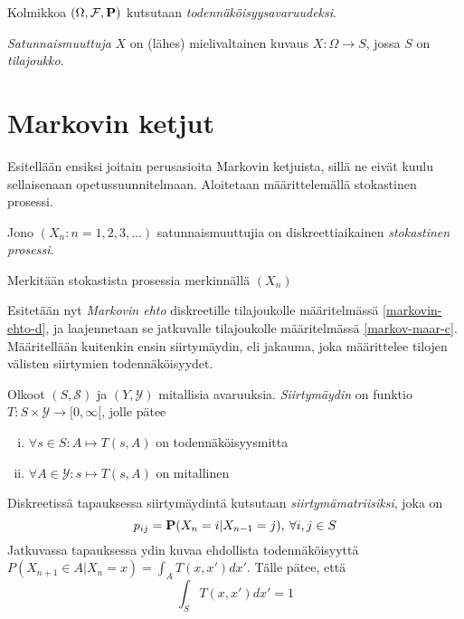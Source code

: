 \begin{maar}
	Kolmikkoa $(\Omega, \mathcal{F}, \textbf{P} )$ kutsutaan \textit{todennäköisyysavaruudeksi}.
\end{maar}

\begin{maar}
	\textit{Satunnaismuuttuja} $X$ on (lähes) mielivaltainen kuvaus $X:\Omega\rightarrow S$, jossa $S$ on \textit{tilajoukko}. 
\end{maar}



\section{Markovin ketjut}\label{kappale: mc}

Esitellään ensiksi joitain perusasioita Markovin ketjuista, sillä ne eivät kuulu sellaisenaan opetussuunnitelmaan. Aloitetaan määrittelemällä stokastinen prosessi.\cite{piiroinen_stokastiset_nodate}

\begin{maar}
	Jono $(X_n:n=1,2,3,...)$ satunnaismuuttujia on diskreettiaikainen \textit{stokastinen prosessi}.
\end{maar}

\begin{merk}
	Merkitään stokastista prosessia merkinnällä $( X_n )$
\end{merk}

Esitetään nyt \textit{Markovin ehto} diskreetille tilajoukolle määritelmässä \ref{markovin-ehto-d}, ja laajennetaan se jatkuvalle tilajoukolle määritelmässä \ref{markov-maar-c}. \cite{monte_carlo_book} Määritellään kuitenkin ensin siirtymäydin, eli jakauma, joka määrittelee tilojen välisten siirtymien todennäköisyydet.  \cite[s.~180]{klenke2013probability}

\begin{maar}
	Olkoot $(S,\mathcal{S})$ ja $(Y, \mathcal{Y})$ mitallisia avaruuksia. \emph{Siirtymäydin} on funktio $T:S\times \mathcal{Y} \rightarrow [0, \infty[$, jolle pätee
	\begin{enumerate}[(i)]
		\item $\forall s \in S: A \mapsto T(s,A)$ on todennäköisyysmitta
		\item $\forall A \in \mathcal{Y}: s \mapsto T(s,A)$ on mitallinen
	\end{enumerate}
	Diskreetissä tapauksessa siirtymäydintä kutsutaan \textit{siirtymämatriisiksi}, joka on 
	\begin{equation}
		p_{ij} = \textbf{P}(X_n = i | X_{n-1} = j), \:\forall i,j \in S
	\end{equation}
	Jatkuvassa tapauksessa ydin kuvaa ehdollista todennäköisyyttä $P(X_{n+1} \in A|X_n = x) = \int_A T(x,x')dx'$. Tälle pätee, että 
	\begin{equation}\label{siirt-tiheys}
		\int_S T(x,x')dx' = 1
	\end{equation}
\end{maar}

